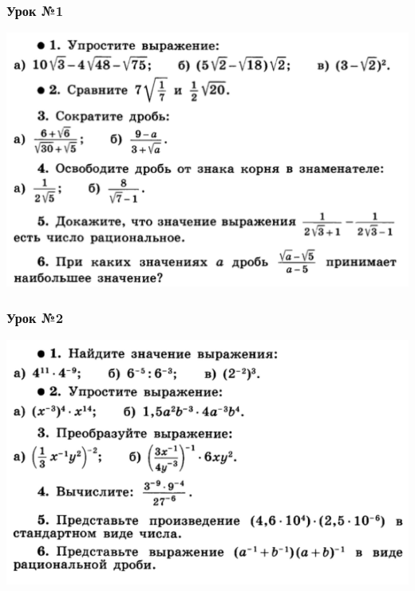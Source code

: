 \documentclass[algebra,a5paper]{pum}
\date{12.05.20}
\begin{document}
\subsubsection*{Урок №1}
\includegraphics[width=\textwidth]{img/21-1.png}

\subsubsection*{Урок №2}
\includegraphics[width=\textwidth]{img/21-2.png}
\end{document}
